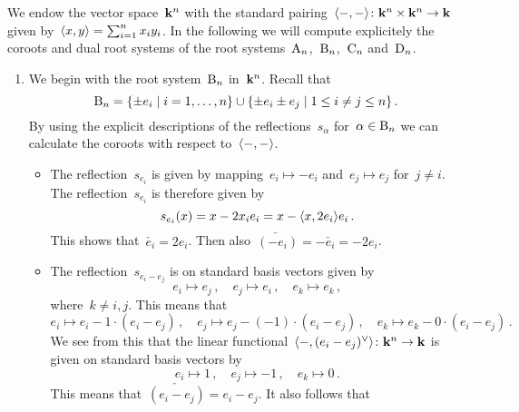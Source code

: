 \begin{example}
  \label{explicit coroots for standard root systems}
  We endow the vector space~$\mathbf{k}^n$ with the standard pairing~$\langle-,-\rangle \colon \mathbf{k}^n \times \mathbf{k}^n \to \mathbf{k}$ given by~$\langle x,y\rangle = \sum_{i=1}^n x_i y_i$.
  In the following we will compute explicitely the coroots and dual root systems of the root systems~$\mathrm{A}_n$,~$\mathrm{B}_n$,~$\mathrm{C}_n$ and~$\mathrm{D}_n$.
  \begin{enumerate}
    \item
      We begin with the root system~$\mathrm{B}_n$ in~$\mathbf{k}^n$.
      Recall that
      \[
        \rootB_n
        =
        \{
          \pm e_i
        \suchthat
          i = 1, \dotsc, n
        \}
        \cup
        \{
          \pm e_i \pm e_j
        \suchthat
          1 \leq i \neq j \leq n
        \} \,.
      \]
      By using the explicit descriptions of the reflections~$s_\alpha$ for~$\alpha \in \mathrm{B}_n$ we can calculate the coroots with respect to~$\langle-,-\rangle$.
      \begin{itemize}
        \item
          The reflection~$s_{e_i}$ is given by mapping~$e_i \mapsto -e_i$ and~$e_j \mapsto e_j$ for~$j \neq i$.
          The reflection~$s_{e_i}$ is therefore given by
          \[
            s_{e_i}(x)
            =
            x - 2 x_i e_i
            =
            x - \langle x, 2 e_i\rangle e_i \,.
          \]
          This shows that~$\check{e_i} = 2 e_i$.
          Then also~$\check{(-e_i)} = -\check{e_i} = -2 e_i$.
        \item
          The reflection~$s_{e_i - e_j}$ is on standard basis vectors given by
          \[
            e_i \mapsto e_j \,,
            \quad
            e_j \mapsto e_i \,,
            \quad
            e_k \mapsto e_k \,,
          \]
          where~$k \neq i,j$.
          This means that
          \[
            e_i
            \mapsto
            e_i - 1 \cdot (e_i - e_j) \,,
            \quad
            e_j
            \mapsto
            e_j - (-1) \cdot (e_i - e_j) \,,
            \quad
            e_k
            \mapsto
            e_k - 0 \cdot (e_i - e_j) \,.
          \]
          We see from this that the linear functional~$\pair{-, \check{(e_i - e_j)}} \colon \kf^n \to \kf$ is given on standard basis vectors by
          \[
            e_i \mapsto 1 \,,
            \quad
            e_j \mapsto -1 \,,
            \quad
            e_k
            \mapsto
            0 \,.
          \]
          This means that~$\check{(e_i - e_j)} = e_i - e_j$.
          It also follows that

\end{itemize}
\end{enumerate}
\end{example}
